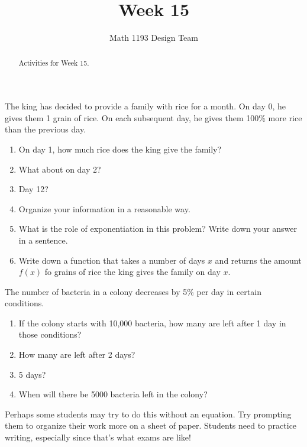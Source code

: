 \documentclass[noauthor,noinstructornotes]{ximera}
\title{Week 15}
\author{Math 1193 Design Team}
\begin{document}
\begin{abstract}
    Activities for Week 15.
\end{abstract}
\maketitle

\begin{problem}
The king has decided to provide a family with rice for a month. 
On day 0, he gives them 1 grain of rice. On each subsequent day, 
he gives them 100\% more rice than the previous day. 

\begin{enumerate}
    \item On day 1, how much rice does the king give the family?
    \item What about on day 2?
    \item Day 12?
    \item Organize your information in a reasonable way.
    \item What is the role of exponentiation in this problem? Write down
    your answer in a sentence.
    \item Write down a function that takes a number of days \(x\)
    and returns the amount \(f(x)\) fo grains of rice the king gives the
    family on day \(x\).
\end{enumerate}
\end{problem}

\begin{problem}
The number of bacteria in a colony decreases by 5\% per day in certain conditions.

\begin{enumerate}
    \item If the colony starts with 10,000 bacteria, how many are left
    after 1 day in those conditions?
    \item How many are left after 2 days?
    \item 5 days?
    \item When will there be 5000 bacteria left in the colony?
\end{enumerate}

\begin{instructorNotes}
Perhaps some students may try to do this without an equation. Try 
prompting them to organize their work more on a sheet of paper.
Students need to practice writing, especially since that's what exams 
are like!
\end{instructorNotes}
\end{problem}
\end{document}
